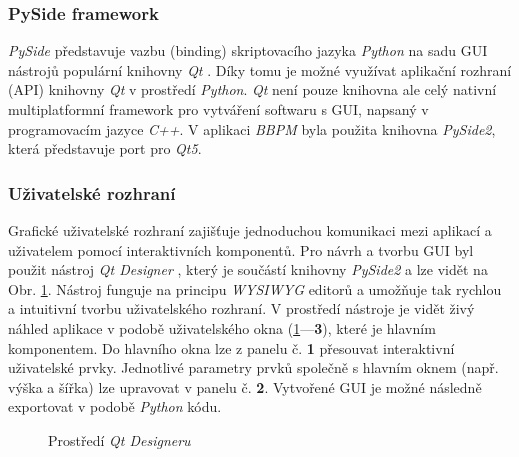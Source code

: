 \subsubsection{PySide framework}
\label{section:pyside}
\textit{PySide} představuje vazbu (binding) skriptovacího jazyka \textit{Python}
na sadu GUI nástrojů populární knihovny \textit{Qt} \cite{Qt}. Díky tomu je
možné využívat aplikační rozhraní (API) knihovny \textit{Qt} v prostředí
\textit{Python}. \textit{Qt} není pouze knihovna ale celý nativní
multiplatformní framework pro vytváření softwaru s GUI, napsaný v programovacím
jazyce \textit{C++}. V aplikaci \textit{BBPM} byla použita knihovna
\textit{PySide2}, která představuje port pro \textit{Qt5}.

\subsubsection{Uživatelské rozhraní}
\label{section:gui}
Grafické uživatelské rozhraní zajišťuje jednoduchou komunikaci mezi aplikací a
uživatelem pomocí interaktivních komponentů. Pro návrh a tvorbu GUI byl použit
nástroj \textit{Qt Designer} \cite{QtDesigner}, který je součástí knihovny
\textit{PySide2} a lze vidět na Obr. \ref{fig:qt_designer}. Nástroj funguje na
principu \textit{WYSIWYG} editorů a umožňuje tak rychlou a intuitivní tvorbu
uživatelského rozhraní. V prostředí nástroje je vidět živý náhled aplikace v
podobě uživatelského okna (\ref{fig:qt_designer}---\textbf{3}), které je hlavním
komponentem. Do hlavního okna lze z panelu č. \textbf{1} přesouvat interaktivní
uživatelské prvky. Jednotlivé parametry prvků společně s hlavním oknem (např.
výška a šířka) lze upravovat v panelu č. \textbf{2}. Vytvořené GUI je možné
následně exportovat v podobě \textit{Python} kódu.

\begin{figure}[h]
    \begin{center}
        \textcolor{black}{\fboxrule=0.5pt\fboxsep=0pt}
        \caption{Prostředí \textit{Qt Designeru}}
        \label{fig:qt_designer}
    \end{center}
\end{figure}

